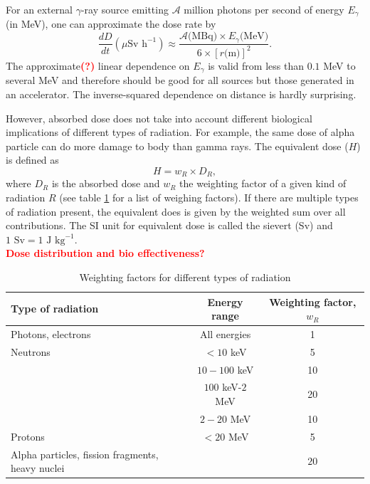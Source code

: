 \documentclass[nofootinbib,preprint,aip,pra]{revtex4-1}
\newcommand{\red}[1]{\textcolor{red}{\bf #1}}
\begin{document}
        For an external $\gamma$-ray source emitting $\mathcal{A}$ million photons per second 
        of energy $E_{\gamma}$
        (in MeV), one can approximate the dose rate by 
        \begin{equation}
            \frac{dD}{dt}(\mu\text{Sv h}^{-1}) \approx \frac{\mathcal{A}\text{(MBq)}\times E_{\gamma}\text{(MeV)}}
            {6\times [r\text{(m)}]^2}.
        \end{equation}
        The approximate\red{(?)} linear dependence on $E_{\gamma}$ is valid from less than $0.1$ MeV to several
        MeV and therefore should be good for all sources but those generated in an accelerator.\cite{my68}
        The inverse-squared dependence on distance is hardly surprising.

        However, absorbed dose does not take into account different biological implications of different types
        of radiation.
        For example, the same dose of alpha particle can do more damage to body than gamma rays. The equivalent
        dose ($H$) is defined as
        \begin{equation}
        H=w_R \times D_R,
        \end{equation}
        where $D_R$ is the absorbed dose and $w_R$ the weighting factor of a given kind of radiation $R$
        (see table \ref{tab:eq} for a list of weighing factors). If there are multiple types of radiation 
        present, the equivalent does is given by the weighted sum over all contributions. The SI unit for
        equivalent dose is called the sievert (Sv) and $1\text{ Sv}=1\text{ J kg}^{-1}$.
        \\\red{Dose distribution and bio effectiveness?}
        \begin{table}
            \label{tab:eq}
            \centering
            \caption{Weighting factors for different types of radiation\cite{icrp74}}
            \begin{ruledtabular}
                \begin{tabular}{l c c}
                Type of radiation & Energy range & Weighting factor, $w_R$\\
                \hline
                Photons, electrons & All energies & 1\\
                Neutrons & $<10$ keV & 5 \\
                         & $10-100$ keV & 10 \\
                         & $100$ keV-$2$ MeV & 20 \\
                         & $2-20$ MeV & 10 \\
                Protons & $<20$ MeV & 5 \\
                Alpha particles, fission fragments, heavy nuclei & & $20$\\
            \end{tabular}
            \end{ruledtabular}
        \end{table}
\end{document}
